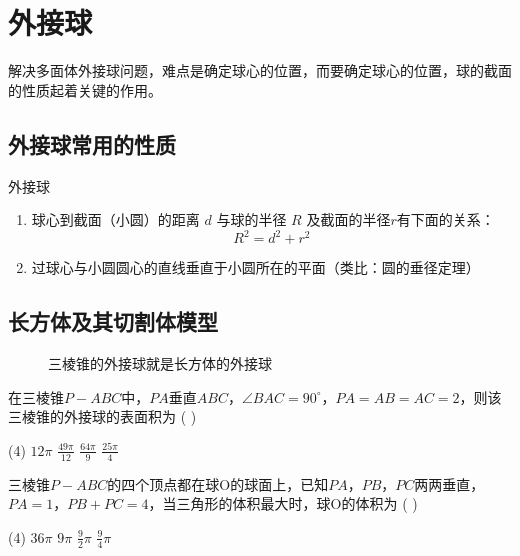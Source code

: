 \section{外接球}

解决多面体外接球问题，难点是确定球心的位置，而要确定球心的位置，球的截面的性质起着关键的作用。

\subsection{外接球常用的性质}

\begin{theorem}{外接球}
    \begin{enumerate}
        \item 球心到截面（小圆）的距离 $d$ 与球的半径 $R$ 及截面的半径$r$有下面的关系：
              \[
                  R^2 = d^2 + r^2
              \]
        \item 过球心与小圆圆心的直线垂直于小圆所在的平面（类比：圆的垂径定理）
    \end{enumerate}
\end{theorem}

\subsection{长方体及其切割体模型}

\begin{figure} [H]
    \centering
    \resizebox{0.2\textwidth}{!}{}
    \caption{三棱锥的外接球就是长方体的外接球}
\end{figure}

\begin{example}
    在三棱锥$P-ABC$中，$PA$垂直$ABC$，$\angle BAC=90^\circ$，$PA=AB=AC=2$，则该三棱锥的外接球的表面积为 ( \hspace{1.5cm} )
    \begin{tasks}(4)
        \task $12\pi$
        \task $\frac{49\pi}{12}$
        \task $\frac{64\pi}{9}$
        \task $\frac{25\pi}{4}$
    \end{tasks}
\end{example}

\begin{example}
    三棱锥$P-ABC$的四个顶点都在球O的球面上，已知$PA$，$PB$，$PC$两两垂直，$PA=1$，$PB+PC=4$，当三角形的体积最大时，球O的体积为 ( \hspace{1.5cm} )
    \begin{tasks}(4)
        \task $36\pi$
        \task $9\pi$
        \task $\frac{9}{2}\pi$
        \task $\frac{9}{4}\pi$
    \end{tasks}
\end{example}

